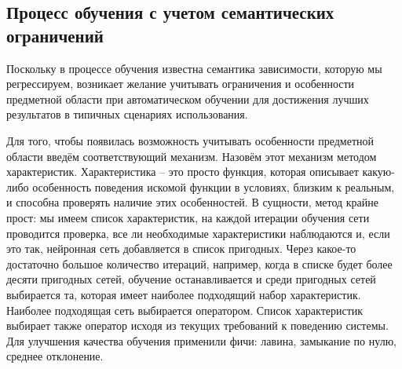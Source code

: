 \documentclass[14pt]{extreport}
\begin{document}
            \subsection{Процесс обучения с учетом семантических ограничений}
                Поскольку в процессе обучения известна семантика зависимости, которую мы регрессируем, возникает желание учитывать ограничения и особенности предметной области при автоматическом обучении для достижения лучших результатов в типичных сценариях использования.

                Для того, чтобы появилась возможность учитывать особенности предметной области введём соответствующий механизм. Назовём этот механизм методом характеристик.
                Характеристика -- это просто функция, которая описывает какую-либо особенность поведения искомой функции в условиях, близким к реальным, и способна проверять наличие этих особенностей.
                В сущности, метод крайне прост: мы имеем список характеристик, на каждой итерации обучения сети проводится проверка, все ли необходимые характеристики наблюдаются и, если это так, нейронная сеть добавляется в список пригодных. Через какое-то достаточно большое количество итераций, например, когда в списке будет более десяти пригодных сетей, обучение останавливается и среди пригодных сетей выбирается та, которая имеет наиболее подходящий набор характеристик. Наиболее подходящая сеть выбирается оператором. Список характеристик выбирает также оператор исходя из текущих требований к поведению системы.
                Для улучшения качества обучения применили фичи: лавина, замыкание по нулю, среднее отклонение.
\end{document}
